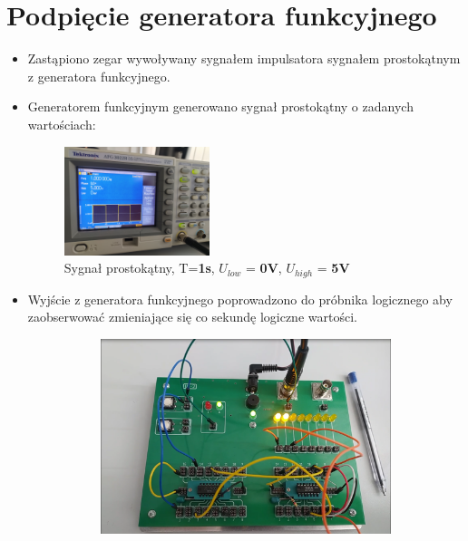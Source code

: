 \section{Podpięcie generatora funkcyjnego}

\begin{itemize}
    \item Zastąpiono zegar wywoływany sygnałem impulsatora sygnałem prostokątnym z generatora funkcyjnego. 
    \item Generatorem funkcyjnym generowano sygnał prostokątny o zadanych wartościach:
        \begin{figure}[H]
            \centering
            \includegraphics[width=0.4\textwidth]{img/synch_RS/1653500525328_scaled.png}
            \caption{Sygnał prostokątny, T=\textbf{1s}, $U_{low}$ = \textbf{0V}, $U_{high}$ = \textbf{5V}}
            \label{fig:my_label}
        \end{figure}
    \item Wyjście z generatora funkcyjnego poprowadzono do próbnika logicznego aby zaobserwować zmieniające się co sekundę logiczne wartości.
        \begin{figure}[H]
            \centering
            \begin{subfigure}[H]{0.4\textwidth}
                \includegraphics[width=\textwidth]{img/synch_RS/generator_0.png}

\end{subfigure}
\end{figure}
\end{itemize}
